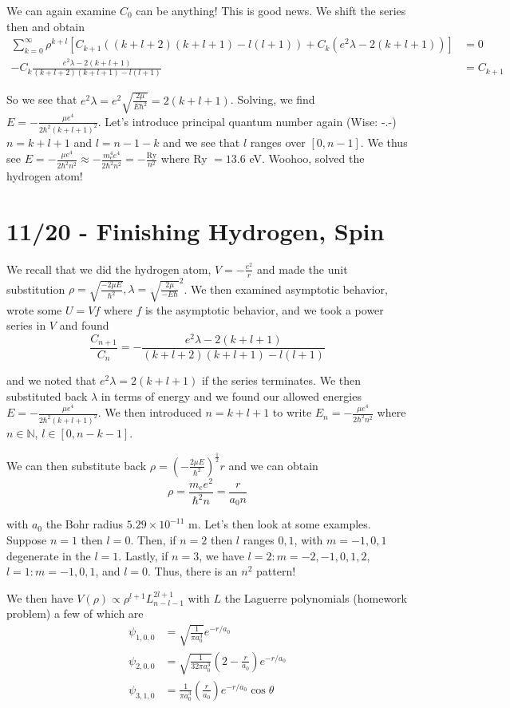 \documentclass[10pt]{report}
\newcommand{\scinot}[2]{#1\times 10^{#2}}
\begin{document}
We can again examine $C_0$ can be anything! This is good news. We shift the series then and obtain
\begin{align*}
    \sum_{k=0}^\infty \rho^{k+l} \left[ C_{k+1}\left( (k+l+2)(k+l+1) - l(l+1) \right) + C_k\left( e^2\lambda - 2\left( k + l + 1 \right) \right) \right] &= 0\\
    -C_k \frac{e^2\lambda - 2(k+l+1)}{(k+l+2)(k+l+1) - l(l+1)} &= C_{k+1}
\end{align*}

So we see that $e^2\lambda= e^2\sqrt{\frac{2\mu}{E\hbar^2}} = 2(k+l+1)$. Solving, we find $E=-\frac{\mu e^4}{2\hbar^2(k+l+1)^2}$. Let's introduce principal quantum number again (Wise: -.-) $n = k+l+1$ and $l = n-1-k$ and we see that $l$ ranges over $\left[ 0,n-1 \right]$. We thus see $E = -\frac{\mu e^4}{2\hbar^2n^2} \approx -\frac{m_e^4 e^4}{2\hbar^2n^2} = -\frac{\mathrm{Ry}}{n^2}$ where Ry $ = 13.6$ eV. Woohoo, solved the hydrogen atom!

\chapter{11/20 - Finishing Hydrogen, Spin}

We recall that we did the hydrogen atom, $V = -\frac{e^2}{r}$ and made the unit substitution $\rho = \sqrt{\frac{-2\mu E}{\hbar^2}}, \lambda = \sqrt{\frac{2\mu}{-E\hbar}}^2$. We then examined asymptotic behavior, wrote some $U = Vf$ where $f$ is the asymptotic behavior, and we took a power series in $V$ and found
$$\frac{C_{n+1}}{C_n} = -\frac{e^2\lambda - 2(k + l + 1)}{(k+l+2)(k+l+1)-l(l+1)}$$

and we noted that $e^2\lambda = 2(k+l+1)$ if the series terminates. We then substituted back $\lambda$ in terms of energy and we found our allowed energies $E = -\frac{\mu e^4}{2\hbar^2(k+l+1)^2}$. We then introduced $n=k+l+1$ to write $E_n = -\frac{\mu e^4}{2\hbar^2n^2}$ where $n \in \mathbb{N}$, $l \in [0,n-k-1]$. 

We can then substitute back $\rho = \left(-\frac{2\mu E}{\hbar^2}\right)^{\frac{1}{2}}r$ and we can obtain
$$\rho = \frac{m_e e^2}{\hbar^2 n} = \frac{r}{a_0 n}$$

with $a_0$ the Bohr radius $\scinot{5.29}{-11}$ m. Let's then look at some examples. Suppose $n=1$ then $l=0$. Then, if $n=2$ then $l$ ranges $0,1$, with $m = -1,0,1$ degenerate in the $l=1$. Lastly, if $n=3$, we have $l=2: m=-2,-1,0,1,2$, $l=1: m = -1,0,1$, and $l=0$. Thus, there is an $n^2$ pattern!

We then have $V(\rho) \propto \rho^{l+1}L_{n-l-1}^{2l+1}$ with $L$ the Laguerre polynomials (homework problem) a few of which are
\begin{align*}
    \psi_{1,0,0} &= \sqrt{\frac{1}{\pi a_0^3}} e^{-r/a_0}\\
    \psi_{2,0,0} &= \sqrt{\frac{1}{32\pi a_0^3}} \left( 2-\frac{r}{a_0} \right)e^{-r/a_0}\\
    \psi_{3,1,0} &= \frac{1}{\pi a_0^3} \left( \frac{r}{a_0} \right)e^{-r/a_0}\cos \theta
\end{align*}
\end{document}

